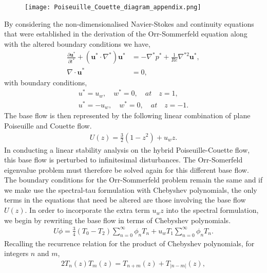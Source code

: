 \documentclass[a4paper, 12pt, twoside, openright]{article}
\numberwithin{equation}{section}
\begin{document}
\begin{figure}[H]
\centering
\texttt{[image: Poiseuille\_Couette\_diagram\_appendix.png]}
\end{figure}

By considering the non-dimensionalised Navier-Stokes and continuity equations that were established in the derivation of the Orr-Sommerfeld equation along with the altered boundary conditions we have,
\begin{align}
\frac{\partial\mathbf{u}^*}{\partial t^*} + \left(\mathbf{u}^*\cdot \nabla^*\right)\mathbf{u}^* &= -\nabla^* p^* + \frac{1}{Re} \nabla^{*2} \mathbf{u}^*, \\
\nabla \cdot \mathbf{u}^* &= 0, 
\end{align}
with boundary conditions,
\begin{align}
u^*=u_w, \quad w^*=0, \quad at \quad z=1,\\
u^*=-u_w, \quad w^*=0, \quad at \quad z=-1.
\end{align}
The base flow is then represented by the following linear combination of plane Poiseuille and Couette flow.
\begin{align}
U(z) = \frac{3}{2}(1-z^2)+u_wz.
\end{align}
In conducting a linear stability analysis on the hybrid Poiseuille-Couette flow, this base flow is perturbed to infinitesimal disturbances. The Orr-Somerfeld eigenvalue problem must therefore be solved again for this different base flow. The boundary conditions for the Orr-Sommerfeld problem remain the same and if we make use the spectral-tau formulation with Chebyshev polynomials, the only terms in the equations that need be altered are those involving the base flow $U(z)$. In order to incorporate the extra term $u_wz$ into the spectral formulation, we begin by rewriting the base flow in terms of Chebyshev polynomials.
\begin{align}
U\phi = \frac{3}{4}(T_0-T_2)\sum_{n=0}^{\infty}\phi_n T_n + u_wT_1\sum_{n=0}^{\infty}\phi_n T_n.  
\end{align}
Recalling the recurrence relation for the product of Chebyshev polynomials, for integers $n$ and $m$,
\begin{align}
2T_n(z)T_m(z) = T_{n+m}(z) + T_{|n-m|}(z),
\end{align}
\end{document}
